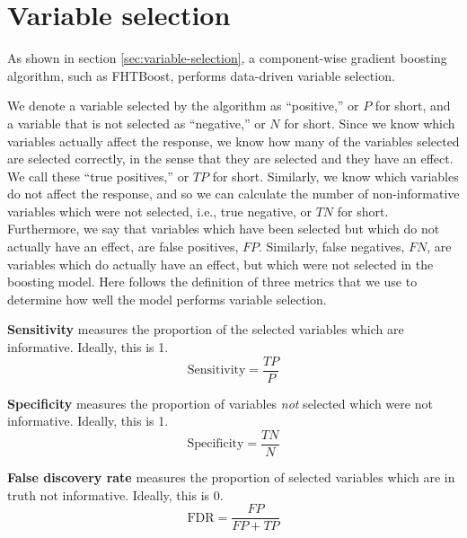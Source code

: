 \section{Variable selection}
As shown in section \ref{sec:variable-selection}, a component-wise gradient boosting algorithm, such as FHTBoost,
performs data-driven variable selection.

We denote a variable selected by the algorithm as ``positive,'' or $P$ for short, and a variable that is not selected as ``negative,'' or $N$ for short.
Since we know which variables actually affect the response, we know how many of the variables selected are selected correctly, in the sense
that they are selected and they have an effect. We call these ``true positives,'' or $TP$ for short.
Similarly, we know which variables do not affect the response, and so we can calculate the number of non-informative variables
which were not selected, i.e., true negative, or $TN$ for short.
Furthermore, we say that variables which have been selected but which do not actually have an effect, are false positives, $FP$.
Similarly, false negatives, $FN$, are variables which do actually have an effect, but which were not selected in the boosting model.
Here follows the definition of three metrics that we use to determine how well the model performs variable selection.

\textbf{Sensitivity} measures the proportion of the selected variables which are informative.
Ideally, this is 1.
\begin{equation}\label{eq:sensitivity}
    \text{Sensitivity}=\frac{TP}{P}
\end{equation}

\textbf{Specificity} measures the proportion of variables \textit{not} selected which were not informative.
Ideally, this is 1.
\begin{equation}\label{eq:specificity}
    \text{Specificity}=\frac{TN}{N}
\end{equation}

\textbf{False discovery rate} measures the proportion of selected variables which are in truth not informative.
Ideally, this is 0.
\begin{equation}\label{eq:accuracy}
    \text{FDR}=\frac{FP}{FP+TP}
\end{equation}

